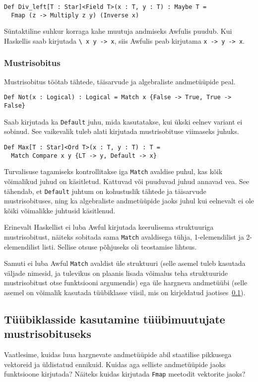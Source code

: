 \documentclass[12pt]{article}
\begin{document}
        \begin{verbatim}Def Div_left[T : Star]<Field T>(x : T, y : T) : Maybe T =
  Fmap (z -> Multiply z y) (Inverse x)\end{verbatim}

        Süntaktiline suhkur korraga kahe muutuja andmiseks Awfulis puudub. Kui Haskellis saab kirjutada \verb!\ x y -> x!, siis Awfulis peab kirjutama \verb!x -> y -> x!.
      \subsubsection{Mustrisobitus}\label{match}
        Mustrisobitus töötab tähtede, täisarvude ja algebraliste andmetüüpide peal.

        \begin{verbatim}Def Not(x : Logical) : Logical = Match x {False -> True, True -> False}\end{verbatim}

        Saab kirjutada ka \verb!Default! juhu, mida kasutatakse, kui ükski eelnev variant ei sobinud. See vaikevalik tuleb alati kirjutada mustrisobituse viimaseks juhuks.

        \begin{verbatim}Def Max[T : Star]<Ord T>(x : T, y : T) : T =
  Match Compare x y {LT -> y, Default -> x}\end{verbatim}

        Turvalisuse tagamiseks kontrollitakse iga \verb!Match! avaldise puhul, kas kõik võimalikud juhud on käsitletud. Kattuvad või puuduvad juhud annavad vea. See tähendab, et \verb!Default! juhtum on kohustuslik tähtede ja täisarvude mustrisobituses, ning ka algebraliste andmetüüpide jaoks juhul kui eelnevalt ei ole kõiki võimalikke juhtusid käsitlenud.

        Erinevalt Haskellist ei luba Awful kirjutada keerulisema struktuuriga mustrisobitust, näiteks sobitada sama \verb!Match! avaldisega tühja, 1-elemendilist ja 2-elemendilist listi. Sellise otsuse põhjuseks oli teostamise lihtsus.

        Samuti ei luba Awful \verb!Match! avaldist üle struktuuri (selle asemel tuleb kasutada väljade nimesid, ja tulevikus on plaanis lisada võimalus teha struktuuride mustrisobitust otse funktsiooni argumendis) ega üle hargneva andmetüübi (selle asemel on võimalik kasutada tüübiklasse viisil, mis on kirjeldatud jaotises~\ref{tyybiklassihakk}).
    \subsection{Tüübiklasside kasutamine tüübimuutujate mustrisobituseks}\label{tyybiklassihakk}
      Vaatlesime, kuidas luua hargnevate andmetüüpide abil staatilise pikkusega vektoreid ja üldistatud ennikuid. Kuidas aga selliste andmetüüpide jaoks funktsioone kirjutada? Näiteks kuidas kirjutada \verb!Fmap! meetodit vektorite jaoks?
\end{document}
